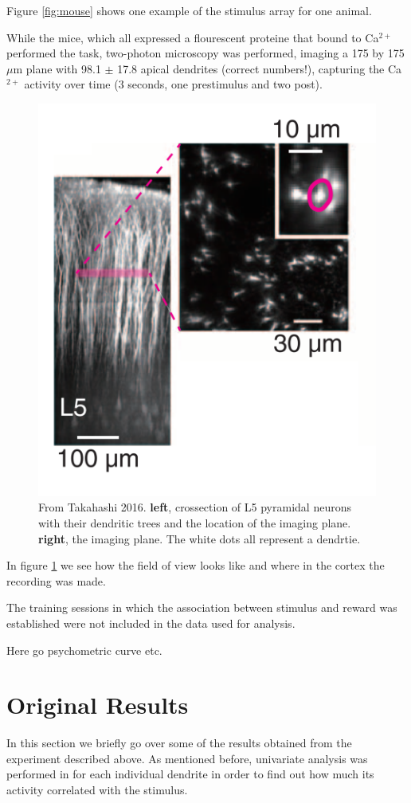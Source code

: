 \documentclass[
10pt, %
a4paper, %
oneside, %
headinclude,footinclude, %
BCOR5mm, %
]{scrartcl}
\begin{document}
Figure \ref{fig:mouse} shows one example of the stimulus array for one animal.

While the mice, which all expressed a flourescent proteine that bound to Ca$^{2+}$ performed the task, two-photon microscopy was performed, imaging a 175 by 175 $\mu$m plane with 98.1 $\pm$ 17.8 apical dendrites (correct numbers!), capturing the Ca$^{2+}$ activity over time (3 seconds, one prestimulus and two post).
\begin{figure}[tb]
\centering 
\includegraphics[width=0.5\columnwidth]{roi.png} 
\caption[BAC Firing]{From Takahashi 2016. \textbf{left}, crossection of L5 pyramidal neurons with their dendritic trees and the location of the imaging plane. \textbf{right}, the imaging plane. The white dots all represent a dendrtie.} %
\label{fig:roi} 
\end{figure}
In figure \ref{fig:roi} we see how the field of view looks like and where in the cortex the recording was made.

The training sessions in which the association between stimulus and reward was established were not included in the data used for analysis.

Here go psychometric curve etc.

\section{Original Results}
In this section we briefly go over some of the results obtained from the experiment described above.                                                                                                                                                                                 
As mentioned before, univariate analysis was performed in \cite{Takahashi2016} for each individual dendrite in order to find out how much its activity correlated with the stimulus. 
\end{document}
